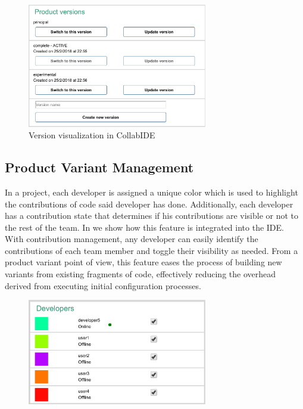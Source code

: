 \begin{figure}[htbp]
  \centering
  \includegraphics[width=0.7\textwidth]{img/fig4-collabIDEVersionManagement}
  \caption{Version visualization in CollabIDE}
  \label{fig:versions}
\end{figure}


\subsection{Product Variant Management}
In a project, each developer is assigned a unique color which is used to highlight the contributions of code said developer has done. Additionally, each developer has a contribution state that determines if his contributions are visible or not to the rest of the team. In  we show how this feature is integrated into the IDE. With contribution management, any developer can easily identify the contributions of each team member and toggle their visibility as needed. From a product variant point of view, this feature eases the process of building new variants from existing fragments of code, effectively reducing the overhead derived from executing initial configuration processes.

\begin{figure}[htbp]
  \centering
  \includegraphics[width=0.7\textwidth]{img/fig3-collabIDEContributionManagement}
  \caption{}
  \label{fig:}
\end{figure}


